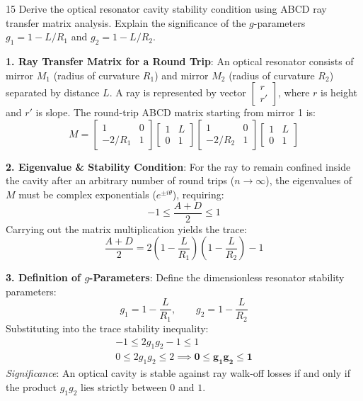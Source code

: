\begin{theoryq}{15}
Derive the optical resonator cavity stability condition using ABCD ray transfer matrix analysis. Explain the significance of the $g$-parameters $g_1 = 1 - L/R_1$ and $g_2 = 1 - L/R_2$.
\end{theoryq}
\begin{theorysol}
\textbf{1. Ray Transfer Matrix for a Round Trip}:
An optical resonator consists of mirror $M_1$ (radius of curvature $R_1$) and mirror $M_2$ (radius of curvature $R_2$) separated by distance $L$.
A ray is represented by vector $\begin{bmatrix} r \\ r' \end{bmatrix}$, where $r$ is height and $r'$ is slope.
The round-trip ABCD matrix starting from mirror 1 is:
\begin{equation}
M = \begin{bmatrix} 1 & 0 \\ -2/R_1 & 1 \end{bmatrix} \begin{bmatrix} 1 & L \\ 0 & 1 \end{bmatrix} \begin{bmatrix} 1 & 0 \\ -2/R_2 & 1 \end{bmatrix} \begin{bmatrix} 1 & L \\ 0 & 1 \end{bmatrix}
\end{equation}

\textbf{2. Eigenvalue \& Stability Condition}:
For the ray to remain confined inside the cavity after an arbitrary number of round trips ($n \to \infty$), the eigenvalues of $M$ must be complex exponentials ($e^{\pm i\theta}$), requiring:
\begin{equation}
-1 \le \frac{A + D}{2} \le 1
\end{equation}
Carrying out the matrix multiplication yields the trace:
\begin{equation}
\frac{A + D}{2} = 2\left(1 - \frac{L}{R_1}\right)\left(1 - \frac{L}{R_2}\right) - 1
\end{equation}

\textbf{3. Definition of $g$-Parameters}:
Define the dimensionless resonator stability parameters:
\begin{equation}
g_1 = 1 - \frac{L}{R_1}, \qquad g_2 = 1 - \frac{L}{R_2}
\end{equation}
Substituting into the trace stability inequality:
\begin{align}
-1 \le 2 g_1 g_2 - 1 \le 1 \\
0 \le 2 g_1 g_2 \le 2 \implies \mathbf{0 \le g_1 g_2 \le 1}
\end{align}
\textit{Significance}: An optical cavity is stable against ray walk-off losses if and only if the product $g_1 g_2$ lies strictly between $0$ and $1$.
\end{theorysol}
\vspace{4mm}

